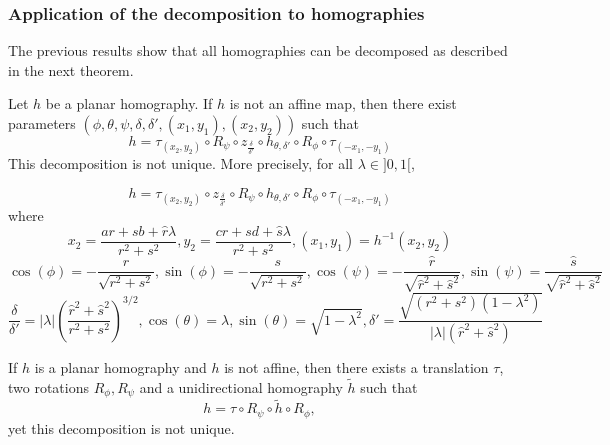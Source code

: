 \subsubsection{Application of the decomposition to homographies}
The previous results show that all homographies can be decomposed as described in the next theorem.

\begin{thm}
Let $h$ be a planar homography. If $h$ is not an affine map, then there exist parameters $(\phi,\theta,\psi,\delta,\delta',(x_1,y_1),(x_2,y_2))$ such that
\begin{equation*}
h = \tau_{(x_2,y_2)} \circ R_{\psi} \circ z_{\frac{\delta}{\delta'}} \circ h_{\theta,\delta'} \circ R_{\phi} \circ \tau_{(-x_1,-y_1)}
\end{equation*}
This decomposition is not unique. More precisely, for all $\lambda \in ]0,1[$,

  \begin{equation*}
h = \tau_{(x_2,y_2)} \circ z_{\frac{\delta}{\delta'}}  \circ R_{\psi} \circ h_{\theta,\delta'} \circ R_{\phi} \circ \tau_{(-x_1,-y_1)}
  \end{equation*}
  where 
 \begin{equation*}
x_2=\frac{ar+sb+\hat r \lambda}{r^2 +s^2}, y_2=\frac{cr+sd+\hat s \lambda}{r^2 +s^2}, (x_1 , y_1) = h^{-1}(x_{2},y_{2})
  \end{equation*}
 \begin{equation*}
 \cos( \phi )= - \frac{r}{\sqrt{r^2 + s^2}}, \sin( \phi )= - \frac{s}{\sqrt{r^2 + s^2}},\cos( \psi ) =- \frac{\hat r}{\sqrt{\hat r^2 + \hat s^2}}, \sin( \psi ) = \frac{\hat s}{\sqrt{\hat r^2 + \hat s^2}}
 \end{equation*}
 \begin{equation*}
 \frac{\delta}{\delta'}=|\lambda|\left(\frac{\hat r^2 + \hat s^2}{r^2 + s^2}\right)^{3/2}, \cos(\theta)=\lambda, \sin(\theta)=\sqrt{1-\lambda^2}, \delta'=  \frac{\sqrt{(r^2 + s^2)(1-\lambda^2)}}{|\lambda| (\hat r^2+\hat s^2)}
 \end{equation*}
\label{thepropdecomp}
\end{thm}

\begin{corollaire} If $h$ is a planar homography and $h$ is not affine, then there exists a translation $\tau$, two rotations $R_\phi ,R_\psi$ and a unidirectional homography $\tilde{h}$ such that
\begin{equation}
h=\tau \circ R_\psi \circ \tilde{h} \circ R_\phi,
\label{formule_decomposition_effective}
\end{equation}
yet this decomposition is not unique.
\end{corollaire}

